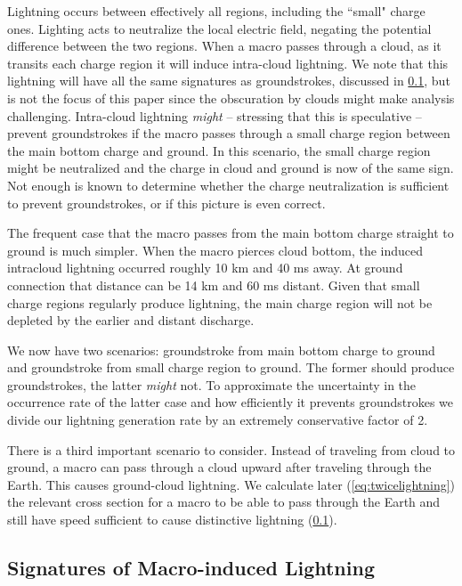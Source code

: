 \documentclass[%
 reprint,
 amsmath,amssymb,
 aps,
 nofootinbib, %
]{revtex4-2}
\begin{document}
        Lightning occurs between effectively all regions, including the ``small" charge ones. Lighting acts to neutralize the local electric field, negating the potential difference between the two regions. When a macro passes through a cloud, as it transits each charge region it will induce intra-cloud lightning. We note that this lightning will have all the same signatures as groundstrokes, discussed in \ref{sec:signatures_of_macro_induced_lightning}, but is not the focus of this paper since the obscuration by clouds might make analysis challenging. Intra-cloud lightning \textit{might} -- stressing that this is speculative -- prevent groundstrokes if the macro passes through a small charge region between the main bottom charge and ground. In this scenario, the small charge region might be neutralized and the charge in cloud and ground is now of the same sign. Not enough is known to determine whether the charge neutralization is sufficient to prevent groundstrokes, or if this picture is even correct.
        
        The frequent case that the macro passes from the main bottom charge straight to ground is much simpler. When the macro pierces cloud bottom, the induced intracloud lightning occurred roughly 10 km and 40 ms away. At ground connection that distance can be 14 km and 60 ms distant. Given that small charge regions regularly produce lightning, the main charge region will not be depleted by the earlier and distant discharge.

        We now have two scenarios: groundstroke from main bottom charge to ground and groundstroke from small charge region to ground. The former should produce groundstrokes, the latter \textit{might} not. To approximate the uncertainty in the occurrence rate of the latter case and how efficiently it prevents groundstrokes we divide our lightning generation rate by an extremely conservative factor of 2.
        
        There is a third important scenario to consider. Instead of traveling from cloud to ground, a macro can pass through a cloud upward after traveling through the Earth. This causes ground-cloud lightning. We calculate later (\ref{eq:twicelightning}) the relevant cross section for a macro to be able to pass through the Earth and still have speed sufficient to cause distinctive lightning (\ref{sec:signatures_of_macro_induced_lightning}).


    \subsection{Signatures of Macro-induced Lightning} %
    \label{sec:signatures_of_macro_induced_lightning}
\end{document}
